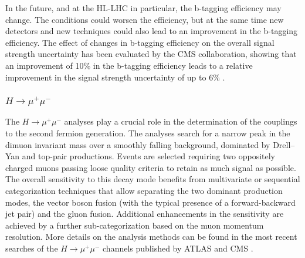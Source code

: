 In the future, and at the HL-LHC in particular, the b-tagging efficiency may change. The conditions could worsen the efficiency, but
at the same time new detectors and new techniques could also lead to an improvement in the b-tagging efficiency. 
The effect of changes in b-tagging efficiency on the overall signal strength uncertainty has been evaluated by the CMS collaboration, showing that an improvement of 10\% in the b-tagging efficiency leads to a relative improvement in the signal strength uncertainty of up to 6\% \cite{CMS-PAS-FTR-18-011}.
%


\subsubsection{$H \to \mu^{+}\mu^{-}$}\label{Sec:2.3.8}
The  $H \to \mu^{+}\mu^{-}$ analyses play a crucial role in the determination of the couplings to the second fermion generation. The analyses search for a narrow peak in the dimuon invariant mass over a smoothly falling background, dominated by Drell--Yan and top-pair productions. Events are selected requiring two oppositely charged muons passing loose quality criteria to retain as much signal as possible. The overall sensitivity to this decay mode benefits from multivariate or sequential categorization techniques that allow separating the two dominant production modes, the vector boson fusion (with the typical presence of a forward-backward jet pair) and the gluon fusion. Additional enhancements in the sensitivity are achieved by a further sub-categorization based on the muon momentum resolution. More details on the analysis methods can be found in the most recent searches of the  $H \to \mu^{+}\mu^{-}$ channels published by ATLAS \cite{Aaboud:2017ojs} and CMS \cite{Sirunyan:2018hbu}.  

